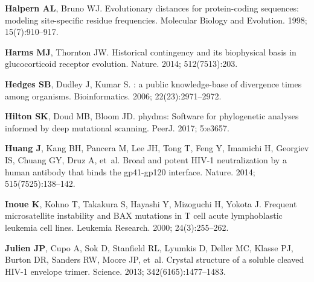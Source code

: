 \documentclass[9pt]{elife}
\begin{document}
\begin{thebibliography}{114}
\textbf{\color{eLifeMediumGrey} Halpern AL}, Bruno WJ.
\newblock Evolutionary distances for protein-coding sequences: modeling
  site-specific residue frequencies.
\newblock Molecular Biology and Evolution.  1998; 15(7):910--917.

\textbf{\color{eLifeMediumGrey} Harms MJ}, Thornton JW.
\newblock Historical contingency and its biophysical basis in glucocorticoid
  receptor evolution.
\newblock Nature.  2014; 512(7513):203.

\textbf{\color{eLifeMediumGrey} Hedges SB}, Dudley J, Kumar S.
: a public knowledge-base of divergence times among
  organisms.
\newblock Bioinformatics.  2006; 22(23):2971--2972.

\textbf{\color{eLifeMediumGrey} Hilton SK}, Doud MB, Bloom JD.
\newblock phydms: Software for phylogenetic analyses informed by deep
  mutational scanning.
\newblock PeerJ.  2017; 5:e3657.

\textbf{\color{eLifeMediumGrey} Huang J}, Kang BH, Pancera M, Lee JH, Tong T,
  Feng Y, Imamichi H, Georgiev IS, Chuang GY, Druz A, et~al.
\newblock Broad and potent HIV-1 neutralization by a human antibody that binds
  the gp41-gp120 interface.
\newblock Nature.  2014; 515(7525):138--142.

\textbf{\color{eLifeMediumGrey} Inoue K}, Kohno T, Takakura S, Hayashi Y,
  Mizoguchi H, Yokota J.
\newblock Frequent microsatellite instability and BAX mutations in T cell acute
  lymphoblastic leukemia cell lines.
\newblock Leukemia Research.  2000; 24(3):255--262.

\textbf{\color{eLifeMediumGrey} Julien JP}, Cupo A, Sok D, Stanfield RL,
  Lyumkis D, Deller MC, Klasse PJ, Burton DR, Sanders RW, Moore JP, et~al.
\newblock Crystal structure of a soluble cleaved HIV-1 envelope trimer.
\newblock Science.  2013; 342(6165):1477--1483.


\end{thebibliography}
\end{document}
